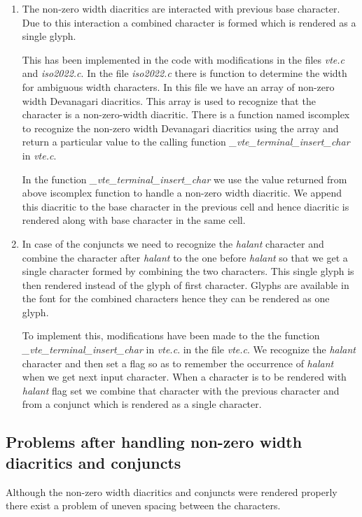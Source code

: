 \begin{enumerate}
\item The non-zero width diacritics are interacted with previous base character. Due to this interaction a combined character is formed which is rendered as a single glyph.

This has been implemented in the code with modifications in the files \textit{vte.c} and \textit{iso2022.c}.
In the file \textit{iso2022.c} there is function to determine the width for ambiguous width characters. In this file we have an array of non-zero width Devanagari diacritics. This array is used to recognize that the character is a non-zero-width diacritic. There is a function named iscomplex to recognize the non-zero width Devanagari diacritics using the array and return a particular value to the calling function \textit{\_vte\_terminal\_insert\_char} in \textit{vte.c}.

In the function \textit{\_vte\_terminal\_insert\_char} we use the value returned from above iscomplex function to handle a non-zero width diacritic. We append this diacritic to the base character in the previous cell and hence diacritic is rendered along with base character in the same cell.

\item In case of the conjuncts we need to recognize the \textit{halant} character and combine the character after \textit{halant} to the one before \textit{halant} so that we get a single character formed by combining the two characters. This single glyph is then rendered instead of the glyph of first character. Glyphs are available in the font for the combined characters hence they can be rendered as one glyph.

To implement this, modifications have been made to the the function \textit{\\\_vte\_terminal\_insert\_char} in \textit{vte.c}. in the file \textit{vte.c}. We recognize the \textit{halant} character and then set a flag so as to remember the occurrence of \textit{halant} when we get next input character. When a character is to be rendered with \textit{halant} flag set we combine that character with the previous character and from a conjunct which is rendered as a single character.
\end{enumerate}

\subsection{Problems after handling non-zero width diacritics and conjuncts}
Although the  non-zero width diacritics and conjuncts were rendered properly there exist a problem of uneven spacing between the characters.

